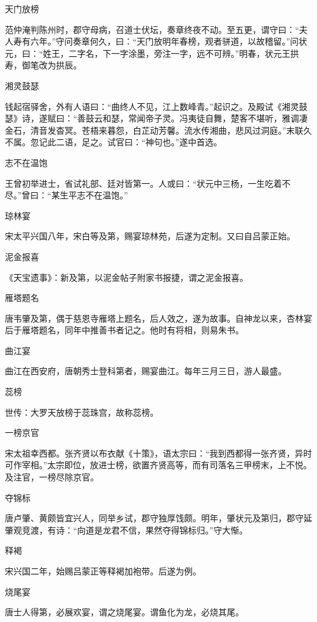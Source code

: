 \documentclass[a4paper,12pt,UTF8,twoside]{ctexbook}
\begin{document}
    天门放榜
    
    范仲淹判陈州时，郡守母病，召道士伏坛，奏章终夜不动。至五更，谓守曰：“夫人寿有六年。”守问奏章何久，曰：“天门放明年春榜，观者骈道，以故稽留。”问状元，曰：“姓王，二字名，下一字涂墨，旁注一字，远不可辨。”明春，状元王拱寿，御笔改为拱辰。
    
    湘灵鼓瑟
    
    钱起宿驿舍，外有人语曰：“曲终人不见，江上数峰青。”起识之。及殿试《湘灵鼓瑟》诗，遂赋曰：“善鼓云和瑟，常闻帝子灵。冯夷徒自舞，楚客不堪听，雅调凄金石，清音发杳冥。苍梧来暮怨，白芷动芳馨。流水传湘曲，悲风过洞庭。”末联久不属。忽记此二语，足之。试官曰：“神句也。”遂中首选。
    
    志不在温饱
    
    王曾初举进士，省试礼部、廷对皆第一。人或曰：“状元中三杨，一生吃着不尽。”曾曰：“某生平志不在温饱。”
    
    琼林宴
    
    宋太平兴国八年，宋白等及第，赐宴琼林苑，后遂为定制。又曰自吕蒙正始。
    
    泥金报喜
    
    《天宝遗事》：新及第，以泥金帖子附家书报捷，谓之泥金报喜。
    
    雁塔题名
    
    唐韦肇及第，偶于慈恩寺雁塔上题名，后人效之，遂为故事。自神龙以来，杏林宴后于雁塔题名，同年中推善书者记之。他时有将相，则易朱书。
    
    曲江宴
    
    曲江在西安府，唐朝秀士登科第者，赐宴曲江。每年三月三日，游人最盛。
    
    蕊榜
    
    世传：大罗天放榜于蕊珠宫，故称蕊榜。
    
    一榜京官
    
    宋太祖幸西都。张齐贤以布衣献《十策》，语太宗曰：“我到西都得一张齐贤，异时可作宰相。”太宗即位，放进士榜，欲置齐贤高等，而有司落名三甲榜末，上不悦。及注官，一榜尽除京官。
    
    夺锦标
    
    唐卢肇、黄颇皆宜兴人，同举乡试，郡守独厚饯颇。明年，肇状元及第归，郡守延肇观竞渡，有诗：“向道是龙君不信，果然夺得锦标归。”守大惭。
    
    释褐
    
    宋兴国二年，始赐吕蒙正等释褐加袍带。后遂为例。
    
    烧尾宴
    
    唐士人得第，必展欢宴，谓之烧尾宴。谓鱼化为龙，必烧其尾。
    
\end{document}
